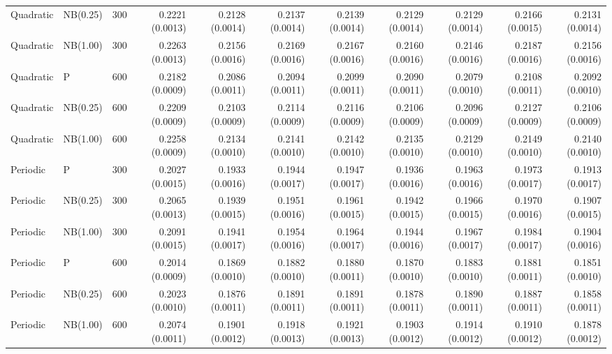 \begin{table}[p]
{\begin{tabular}{lllrrrrrrrr}
Quadratic & NB(0.25) & 300 & 0.2221 (0.0013) & 0.2128 (0.0014) & 0.2137 (0.0014) & 0.2139 (0.0014) & 0.2129 (0.0014) & 0.2129 (0.0014) & 0.2166 (0.0015) & 0.2131 (0.0014) \\
Quadratic & NB(1.00) & 300 & 0.2263 (0.0013) & 0.2156 (0.0016) & 0.2169 (0.0016) & 0.2167 (0.0016) & 0.2160 (0.0016) & 0.2146 (0.0016) & 0.2187 (0.0016) & 0.2156 (0.0016) \\
Quadratic & P & 600 & 0.2182 (0.0009) & 0.2086 (0.0011) & 0.2094 (0.0011) & 0.2099 (0.0011) & 0.2090 (0.0011) & 0.2079 (0.0010) & 0.2108 (0.0011) & 0.2092 (0.0010) \\
Quadratic & NB(0.25) & 600 & 0.2209 (0.0009) & 0.2103 (0.0009) & 0.2114 (0.0009) & 0.2116 (0.0009) & 0.2106 (0.0009) & 0.2096 (0.0009) & 0.2127 (0.0009) & 0.2106 (0.0009) \\
Quadratic & NB(1.00) & 600 & 0.2258 (0.0009) & 0.2134 (0.0010) & 0.2141 (0.0010) & 0.2142 (0.0010) & 0.2135 (0.0010) & 0.2129 (0.0010) & 0.2149 (0.0010) & 0.2140 (0.0010) \\
\hline
Periodic & P & 300 & 0.2027 (0.0015) & 0.1933 (0.0016) & 0.1944 (0.0017) & 0.1947 (0.0017) & 0.1936 (0.0016) & 0.1963 (0.0016) & 0.1973 (0.0017) & 0.1913 (0.0017) \\
Periodic & NB(0.25) & 300 & 0.2065 (0.0013) & 0.1939 (0.0015) & 0.1951 (0.0016) & 0.1961 (0.0015) & 0.1942 (0.0015) & 0.1966 (0.0015) & 0.1970 (0.0016) & 0.1907 (0.0015) \\
Periodic & NB(1.00) & 300 & 0.2091 (0.0015) & 0.1941 (0.0017) & 0.1954 (0.0016) & 0.1964 (0.0017) & 0.1944 (0.0016) & 0.1967 (0.0017) & 0.1984 (0.0017) & 0.1904 (0.0016) \\
Periodic & P & 600 & 0.2014 (0.0009) & 0.1869 (0.0010) & 0.1882 (0.0010) & 0.1880 (0.0011) & 0.1870 (0.0010) & 0.1883 (0.0010) & 0.1881 (0.0011) & 0.1851 (0.0010) \\
Periodic & NB(0.25) & 600 & 0.2023 (0.0010) & 0.1876 (0.0011) & 0.1891 (0.0011) & 0.1891 (0.0011) & 0.1878 (0.0011) & 0.1890 (0.0011) & 0.1887 (0.0011) & 0.1858 (0.0011) \\
Periodic & NB(1.00) & 600 & 0.2074 (0.0011) & 0.1901 (0.0012) & 0.1918 (0.0013) & 0.1921 (0.0013) & 0.1903 (0.0012) & 0.1914 (0.0012) & 0.1910 (0.0012) & 0.1878 (0.0012) \\
\hline
\end{tabular}%
}
\end{table}
